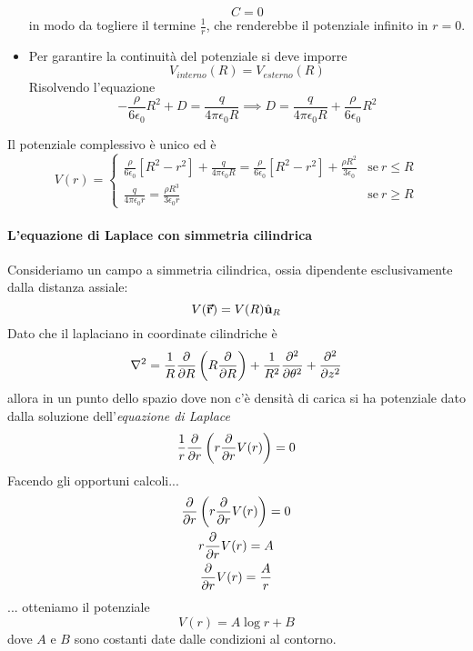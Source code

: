 \begin{examplewt}
\begin{itemize}
		\begin{equation*}
			C=0
		\end{equation*}
		in modo da togliere il termine $\frac{1}{r}$, che renderebbe il potenziale infinito in $r=0$.
		\item Per garantire la continuità del potenziale si deve imporre
		\begin{equation*}
			V_{interno}(R)=V_{esterno}(R)
		\end{equation*}
			Risolvendo l'equazione
		\begin{equation*}
			-\frac{\rho}{6\epsilon_0}R^2+D=\frac{q}{4\pi\epsilon_0R}\implies D=\frac{q}{4\pi\epsilon_0R}+\frac{\rho}{6\epsilon_0}R^2
		\end{equation*}
	\end{itemize}
Il potenziale complessivo è unico ed è
\begin{equation}
	V(r)=
	\begin{cases}
		\frac{\rho}{6\epsilon_0}\left[R^2-r^2\right]+\frac{q}{4\pi\epsilon_0R}=\frac{\rho}{6\epsilon_0}\left[R^2-r^2\right]+\frac{\rho R^2}{3\epsilon_0}&\text{se}\ r\leq R\\
		\frac{q}{4\pi\epsilon_0r}=\frac{\rho R^3}{3\epsilon_0r}&\text{se}\ r\geq R
	\end{cases}
\end{equation}
\end{examplewt}
\paragraph{L'equazione di Laplace con simmetria cilindrica}
Consideriamo un campo a simmetria cilindrica, ossia dipendente esclusivamente dalla distanza assiale:
\begin{equation*}
	V(\vb*{\va{r}})=V(R)\hat{\mathbf{u}}_R
\end{equation*}
Dato che il laplaciano in coordinate cilindriche è
\begin{equation*}
	\laplacian=\frac{1}{R}\pdv{R}\left(R\pdv{R}\right)+\frac{1}{R^2}\pdv[2]{\theta}+\pdv[2]{z}
\end{equation*}
allora in un punto dello spazio dove non c'è densità di carica si ha potenziale dato dalla soluzione dell'\textit{equazione di Laplace}
\begin{equation*}
	\frac{1}{r}\pdv{r}\left(r\pdv{r}V(r)\right)=0
\end{equation*}
Facendo gli opportuni calcoli...
\begin{gather*}
	\pdv{r}\left(r\pdv{r}V(r)\right)=0\\
	r\pdv{r}V(r)=A\\
	\pdv{r}V(r)=\frac{A}{r}\\
\end{gather*}
... otteniamo il potenziale
\begin{equation}
	V(r)=A\log{r}+B
\end{equation}
dove $A$ e $B$ sono costanti date dalle condizioni al contorno.


